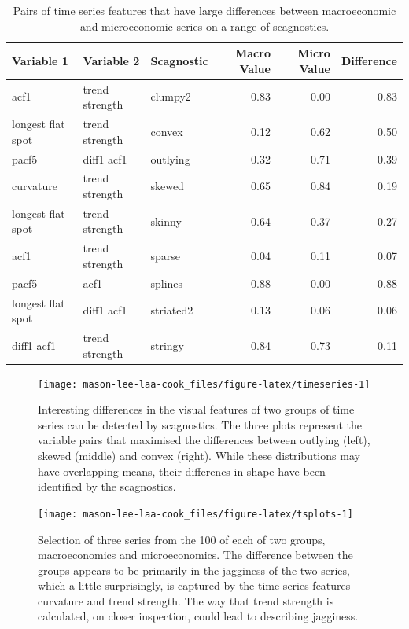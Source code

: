 \begin{table}

\caption{\label{tab:scagsmacmic-pdf}Pairs of time series features that have large differences between macroeconomic and microeconomic series on a range of scagnostics.}
\centering
\begin{tabular}[t]{lllrrr}
\toprule
Variable 1 & Variable 2 & Scagnostic & Macro Value & Micro Value & Difference\\
\midrule
acf1 & trend strength & clumpy2 & 0.83 & 0.00 & 0.83\\
longest flat spot & trend strength & convex & 0.12 & 0.62 & 0.50\\
pacf5 & diff1 acf1 & outlying & 0.32 & 0.71 & 0.39\\
curvature & trend strength & skewed & 0.65 & 0.84 & 0.19\\
longest flat spot & trend strength & skinny & 0.64 & 0.37 & 0.27\\
\addlinespace
acf1 & trend strength & sparse & 0.04 & 0.11 & 0.07\\
pacf5 & acf1 & splines & 0.88 & 0.00 & 0.88\\
longest flat spot & diff1 acf1 & striated2 & 0.13 & 0.06 & 0.06\\
diff1 acf1 & trend strength & stringy & 0.84 & 0.73 & 0.11\\
\bottomrule
\end{tabular}
\end{table}

\begin{figure}
\texttt{[image: mason-lee-laa-cook\_files/figure-latex/timeseries-1]} \caption{Interesting differences in the visual features of two groups of time series can be detected by scagnostics. The three plots represent the variable pairs that maximised the differences between outlying (left), skewed (middle) and convex (right). While these distributions may have overlapping means, their differencs in shape have been identified by the scagnostics.}\label{fig:timeseries}
\end{figure}

\begin{figure}
\texttt{[image: mason-lee-laa-cook\_files/figure-latex/tsplots-1]} \caption{Selection of three series from the 100 of each of two groups, macroeconomics and microeconomics. The difference between the groups appears to be primarily in the jagginess of the two series, which a little surprisingly, is captured by the time series features curvature and trend strength. The way that trend strength is calculated, on closer inspection, could lead to describing jagginess.}\label{fig:tsplots}
\end{figure}

